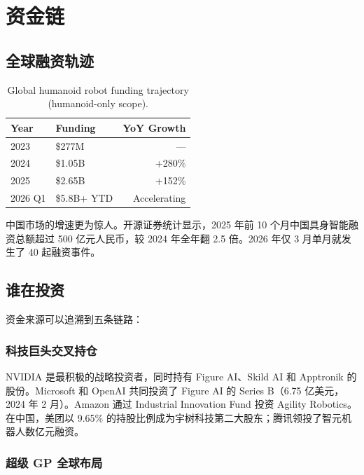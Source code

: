 \chapter{资金链}
\label{ch:money}

\section{全球融资轨迹}

\begin{table}[htbp]
\centering
\caption{Global humanoid robot funding trajectory (humanoid-only scope).}
\label{tab:funding}
\begin{tabular}{llr}
\toprule
\rowcolor{figLightGray}
\textbf{Year} & \textbf{Funding} & \textbf{YoY Growth} \\
\midrule
2023 & \$277M & --- \\
2024 & \$1.05B & +280\% \\
2025 & \$2.65B & +152\% \\
2026 Q1 & \$5.8B+ YTD & Accelerating \\
\bottomrule
\end{tabular}
\end{table}

中国市场的增速更为惊人。开源证券统计显示，2025 年前 10 个月中国具身智能融资总额超过 500 亿元人民币，较 2024 年全年翻 2.5 倍\cite{kaiyuan2025embodied}。2026 年仅 3 月单月就发生了 40 起融资事件\cite{kaiyuan2026q1}。

\section{谁在投资}

资金来源可以追溯到五条链路：

\subsection{科技巨头交叉持仓}

NVIDIA 是最积极的战略投资者，同时持有 Figure AI、Skild AI 和 Apptronik 的股份。Microsoft 和 OpenAI 共同投资了 Figure AI 的 Series B（6.75 亿美元，2024 年 2 月）。Amazon 通过 Industrial Innovation Fund 投资 Agility Robotics\cite{agility2024seriesb}。在中国，美团以 9.65\% 的持股比例成为宇树科技第二大股东\cite{unitree2026ipo}；腾讯领投了智元机器人数亿元融资\cite{agibot2025tencent}。

\subsection{超级 GP 全球布局}

